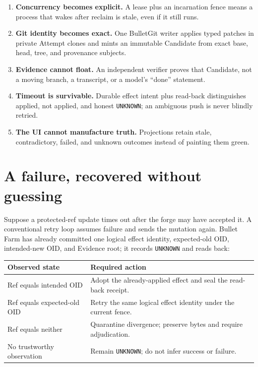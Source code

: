 \documentclass[11pt,letterpaper]{article}
\newenvironment{tightenum}{\setlength{\topsep}{1pt}\setlength{\partopsep}{0pt}\begin{enumerate}\setlength{\itemsep}{1pt}\setlength{\parskip}{0pt}\setlength{\parsep}{0pt}}{\end{enumerate}}
\begin{document}
\begin{tightenum}
\item \textbf{Concurrency becomes explicit.} A lease plus an incarnation fence
means a process that wakes after reclaim is stale, even if it still runs.
\item \textbf{Git identity becomes exact.} One BulletGit writer applies typed
patches in private Attempt clones and mints an immutable Candidate from exact
base, head, tree, and provenance subjects.
\item \textbf{Evidence cannot float.} An independent verifier proves that
Candidate, not a moving branch, a transcript, or a model's ``done'' statement.
\item \textbf{Timeout is survivable.} Durable effect intent plus read-back
distinguishes applied, not applied, and honest \texttt{UNKNOWN}; an ambiguous
push is never blindly retried.
\item \textbf{The UI cannot manufacture truth.} Projections retain stale,
contradictory, failed, and unknown outcomes instead of painting them green.
\end{tightenum}

\section*{A failure, recovered without guessing}

Suppose a protected-ref update times out after the forge may have accepted it.
A conventional retry loop assumes failure and sends the mutation again. Bullet
Farm has already committed one logical effect identity, expected-old OID,
intended-new OID, and Evidence root; it records \texttt{UNKNOWN} and reads back:

\begin{tabularx}{\textwidth}{@{}p{}X@{}}
\toprule
Observed state & Required action \\
\midrule
Ref equals intended OID & Adopt the already-applied effect and seal the read-back receipt. \\
Ref equals expected-old OID & Retry the same logical effect identity under the current fence. \\
Ref equals neither & Quarantine divergence; preserve bytes and require adjudication. \\
No trustworthy observation & Remain \texttt{UNKNOWN}; do not infer success or failure. \\
\bottomrule
\end{tabularx}
\end{document}
